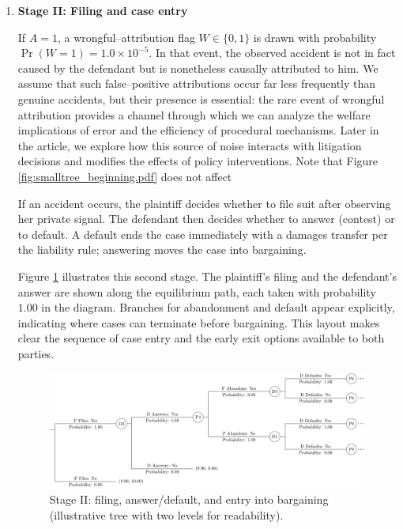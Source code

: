 \documentclass{article}
\begin{document}
\begin{enumerate}
  \item \textbf{Stage II: Filing and case entry}

If $A=1$, a wrongful--attribution flag $W \in \{0,1\}$ is drawn with probability $\Pr(W=1) = 1.0 \times 10^{-5}$. In that event, the observed accident is not in fact caused by the defendant but is nonetheless causally attributed to him. We assume that such false--positive attributions occur far less frequently than genuine accidents, but their presence is essential: the rare event of wrongful attribution provides a channel through which we can analyze the welfare implications of error and the efficiency of procedural mechanisms. Later in the article, we explore how this source of noise interacts with litigation decisions and modifies the effects of policy interventions. Note that Figure \ref{fig:smalltree_beginning.pdf} does not affect 


  If an accident occurs, the plaintiff decides whether to file suit after observing her private signal. The defendant then decides whether to answer (contest) or to default. A default ends the case immediately with a damages transfer per the liability rule; answering moves the case into bargaining.

  Figure \ref{fig:smalltree_mid.pdf} illustrates this second stage. The plaintiff’s filing and the defendant’s answer are shown along the equilibrium path, each taken with probability $1.00$ in the diagram. Branches for abandonment and default appear explicitly, indicating where cases can terminate before bargaining. This layout makes clear the sequence of case entry and the early exit options available to both parties.

  \begin{figure}[t]
    \centering
    \includegraphics[width=\textwidth]{../Figures/smalltree_mid.pdf}
    \caption{Stage II: filing, answer/default, and entry into bargaining (illustrative tree with two levels for readability).}
    \label{fig:smalltree_mid.pdf}
  \end{figure}


\end{enumerate}
\end{document}
